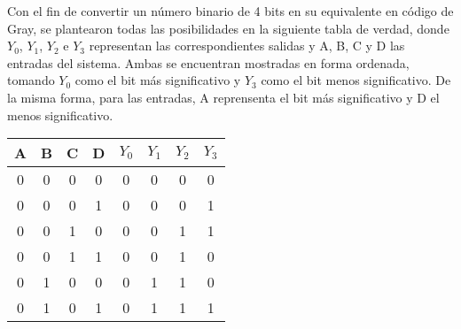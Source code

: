 \noindent
Con el fin de convertir un número binario de 4 bits en su equivalente en código de Gray, se plantearon todas las posibilidades en la siguiente tabla de verdad, donde $Y_0$, $Y_1$, $Y_2$ e $Y_3$ representan las correspondientes salidas y A, B, C y D las entradas del sistema. Ambas se encuentran mostradas en forma ordenada, tomando $Y_0$ como el bit m\'as significativo y $Y_3$ como el bit menos significativo. De la misma forma, para las entradas, A reprensenta el bit m\'as significativo y D el menos significativo.

\begin{table}[h!]
\centering
\begin{tabular}{|cccc|cccc|}
\hline

\multicolumn{1}{|c}{A} & \multicolumn{1}{c}{B}   & \multicolumn{1}{c}{C}   & D                        & \multicolumn{1}{c}{$Y_0$}   & \multicolumn{1}{c}{$Y_1$}   & \multicolumn{1}{c}{$Y_2$}   & $Y_3$                        \\ \hline
\rowcolor[HTML]{34FF34} 
0                       & 0                        & 0                        & 0                        & \cellcolor[HTML]{FD6864}0 & \cellcolor[HTML]{FD6864}0 & \cellcolor[HTML]{FD6864}0 & \cellcolor[HTML]{FD6864}0 \\
\rowcolor[HTML]{34FF34} 
0                       & 0                        & 0                        & 1                        & \cellcolor[HTML]{FD6864}0 & \cellcolor[HTML]{FD6864}0 & \cellcolor[HTML]{FD6864}0 & \cellcolor[HTML]{FD6864}1 \\
\rowcolor[HTML]{34FF34} 
0                       & 0                        & 1                        & 0                        & \cellcolor[HTML]{FD6864}0 & \cellcolor[HTML]{FD6864}0 & \cellcolor[HTML]{FD6864}1 & \cellcolor[HTML]{FD6864}1 \\
\rowcolor[HTML]{34FF34} 
0                       & {\color[HTML]{333333} 0} & {\color[HTML]{333333} 1} & {\color[HTML]{333333} 1} & \cellcolor[HTML]{FD6864}0 & \cellcolor[HTML]{FD6864}0 & \cellcolor[HTML]{FD6864}1 & \cellcolor[HTML]{FD6864}0 \\
\rowcolor[HTML]{34FF34} 
0                       & {\color[HTML]{333333} 1} & {\color[HTML]{333333} 0} & {\color[HTML]{333333} 0} & \cellcolor[HTML]{FD6864}0 & \cellcolor[HTML]{FD6864}1 & \cellcolor[HTML]{FD6864}1 & \cellcolor[HTML]{FD6864}0 \\
\rowcolor[HTML]{34FF34} 
0                       & {\color[HTML]{333333} 1} & {\color[HTML]{333333} 0} & {\color[HTML]{333333} 1} & \cellcolor[HTML]{FD6864}0 & \cellcolor[HTML]{FD6864}1 & \cellcolor[HTML]{FD6864}1 & \cellcolor[HTML]{FD6864}1 \\

\end{tabular}
\end{table}
